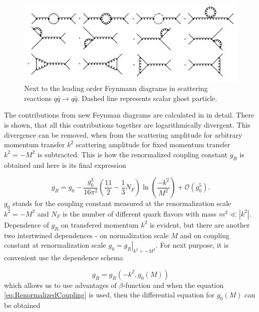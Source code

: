 \documentclass[a4paper,11pt]{report}
\begin{document}
\begin{figure}[t]
  \centering
  \includegraphics[width=\textwidth]{Chapter1/QuarkQuarkCorrection.png} 
  \caption{Next to the leading order Feynmann diagrams in scattering reactions
    $q \bar{q} \rightarrow q \bar{q}$. Dashed line represents scalar ghost
  particle.}
  \label{fig:QuarkQuarkScatteringCorrection}
\end{figure}

The contributions from new Feynman diagrams are calculated in \cite{QCDTextbook}
in detail. There is shown, that all this contributions together are
logarithmically divergent. This divergence can be removed, when from the scattering
amplitude for arbitrary momentum transfer $k^2$ scattering amplitude for fixed
momentum transfer $k^2 = -M^2$ is subtracted. This is how the renormalized
coupling constant $g_R$ is obtained and here is its final expression 

\begin{equation}
  g_R = g_0 - \frac{g_0^3}{16\pi^2} \left( \frac{11}{2} - \frac{1}{3}N_F \right)
  \ln \left( \frac{-k^2}{M^2} \right) + \mathscr{O}(g_0^5).
  \label{eq:RenormalizedCoupling}
\end{equation}
$g_0$ stands for the coupling constant measured at the renormalization scale
$k^2 = -M^2$ and $N_F$ is the number of different quark flavors with mass $m^2
\ll \left| k^2 \right|$. Dependence of $g_R$ on transfered momentum $k^2$ is
evident, but there are another two intertwined dependences - on normalization
scale $M$ and on coupling constant at renormalization scale $g_0 =
\left. g_R \right|_{k^2=-M^2}$. For next purpose, it is convenient use the dependence schema

\begin{equation}
  g_R = g_R(-k^2,g_0(M))
  \label{eq:RunningCouplingConstantDependenceSchema}
\end{equation}
which allows us to use advantages of $\beta$-function and when the equation
\eqref{eq:RenormalizedCoupling} is used, then the differential
equation for $g_0(M)$ can be obtained
\end{document}
